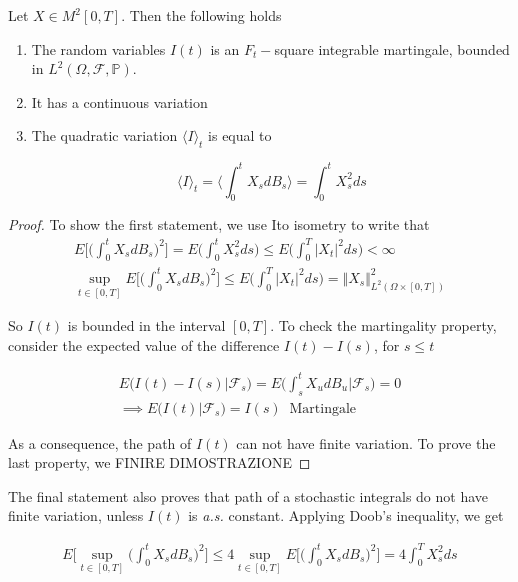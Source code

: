 \begin{theorem}
    Let $X \in M^2[0,T]$. Then the following holds
\begin{enumerate}
    \item The random variables $I(t)$ is an $F_t-$square integrable martingale, bounded in $L^2(\Omega,\mathcal{F},\mathbb{P})$. 
    \item It has a continuous variation
    \item The quadratic variation $\langle I \rangle_t$ is equal to

    \begin{equation}
        \langle I \rangle_t = \big\langle \int_0^t X_s dB_s \big\rangle = \int_0^t X_s^2 ds
    \end{equation}
\end{enumerate}
\end{theorem}
\begin{proof}
    To show the first statement, we use Ito isometry to write that
    \begin{gather*}
        E\Bigg[ \Bigg( \int_0^t X_s dB_s \Bigg)^2 \Bigg] = E\Bigg( \int_0^t X_s^2 ds \Bigg) \leq E\Bigg( \int_0^T \vert X_t \vert^2 ds \Bigg) < \infty \\
        \sup_{t \in [0,T]} E\Bigg[ \Bigg( \int_0^t X_s dB_s \Bigg)^2\Bigg] \leq E\Bigg( \int_0^T \vert X_t \vert^2 ds \Bigg) = \Vert X_s \Vert_{L^2(\Omega \times [0,T])}^2
    \end{gather*}

    So $I(t)$ is bounded in the interval $[0,T]$. To check the martingality property, consider the expected value of the difference $I(t)-I(s)$, for $s \leq t$

    \begin{gather*}
        E\Big( I(t)-I(s) \Big\vert \mathcal{F}_s \Big) = E\Bigg( \int_s^t X_u dB_u \Big\vert \mathcal{F}_s \Bigg) = 0 \\
        \implies E\big( I(t) \vert \mathcal{F}_s \big) = I(s) \;\; \text{Martingale}
    \end{gather*}

    As a consequence, the path of $I(t)$ can not have finite variation.
    To prove the last property, we FINIRE DIMOSTRAZIONE
\end{proof}

The final statement also proves that path of a stochastic integrals do not have finite variation, unless $I(t)$ is \textit{a.s.} constant. Applying Doob's inequality, we get

\begin{gather*}
    E\Bigg[ \sup_{t \in [0,T]} \Bigg( \int_0^t X_s dB_s \Bigg)^2 \Bigg] \leq 4 \sup_{t \in [0,T]} E\Bigg[ \Bigg( \int_0^t X_s dB_s \Bigg)^2 \Bigg] = 4 \int_0^T X_s^2 ds
\end{gather*}

